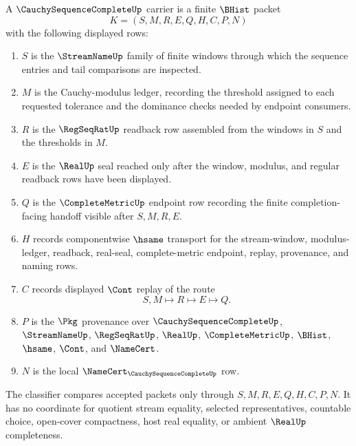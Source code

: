 \begin{definition}
\label{def:cauchy-sequence-complete-carrier}
A $\CauchySequenceCompleteUp$ carrier is a finite $\BHist$ packet
$$
K=(S,M,R,E,Q,H,C,P,N)
$$
with the following displayed rows:
\begin{enumerate}
\item $S$ is the $\StreamNameUp$ family of finite windows through which the sequence entries and tail comparisons are inspected.
\item $M$ is the Cauchy-modulus ledger, recording the threshold assigned to each requested tolerance and the dominance checks needed by endpoint consumers.
\item $R$ is the $\RegSeqRatUp$ readback row assembled from the windows in $S$ and the thresholds in $M$.
\item $E$ is the $\RealUp$ seal reached only after the window, modulus, and regular readback rows have been displayed.
\item $Q$ is the $\CompleteMetricUp$ endpoint row recording the finite completion-facing handoff visible after $S,M,R,E$.
\item $H$ records componentwise $\hsame$ transport for the stream-window, modulus-ledger, readback, real-seal, complete-metric endpoint, replay, provenance, and naming rows.
\item $C$ records displayed $\Cont$ replay of the route
$$
S,M \longmapsto R \longmapsto E \longmapsto Q .
$$
\item $P$ is the $\Pkg$ provenance over $\CauchySequenceCompleteUp$, $\StreamNameUp$, $\RegSeqRatUp$, $\RealUp$, $\CompleteMetricUp$, $\BHist$, $\hsame$, $\Cont$, and $\NameCert$.
\item $N$ is the local $\NameCert_{\CauchySequenceCompleteUp}$ row.
\end{enumerate}
The classifier compares accepted packets only through $S,M,R,E,Q,H,C,P,N$. It has no coordinate for quotient stream equality, selected representatives, countable choice, open-cover compactness, host real equality, or ambient $\RealUp$ completeness.
\end{definition}

